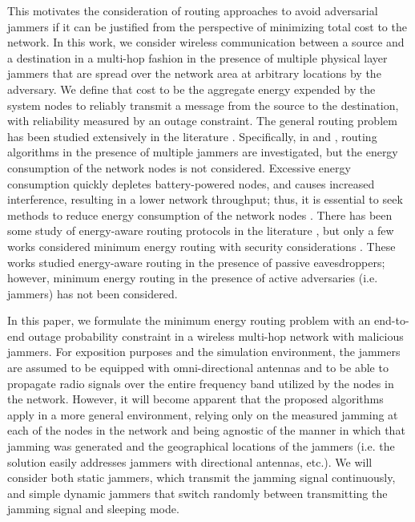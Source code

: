 \documentclass[10pt,journal]{IEEEtran}
\theoremstyle{definition}
\begin{document}
This motivates the consideration of routing approaches to avoid adversarial jammers  if it can be justified from the perspective of minimizing total cost to the network. In this work, we consider wireless communication between a source and a destination in a multi-hop fashion in the presence of multiple physical layer jammers that are spread over the network area at arbitrary locations by the adversary. 
 We define that cost to be the aggregate energy expended by the system nodes to reliably transmit a message from the source to the destination, with reliability measured by an outage constraint.
The general routing problem has been studied extensively in the literature
 \cite{broch1998performance,royer1999review,draves2004routing,perkins2008ad}. 
Specifically, in \cite{altman2009jamming} and \cite{tague2011jamming}, routing algorithms in the presence of multiple jammers are investigated, but the energy consumption of the network nodes is not considered.
 Excessive energy consumption quickly depletes  battery-powered nodes, and causes increased interference, resulting in a lower network throughput; thus, it is essential to seek  methods to  reduce  energy consumption of the network nodes \cite{feeney2001investigating}. 
There has been some study of energy-aware  routing protocols in the literature \cite{singh1998power,rodoplu1999minimum,chang2000energy,kwon2006energy,dehghan2011minimum}, but only a few works  considered minimum energy routing with security considerations \cite{ghaderi2013efficient,ghaderi2014min}. 
These works studied energy-aware routing in the presence of passive eavesdroppers; however, minimum energy routing in the presence of active adversaries (i.e. jammers) has not been considered.

In this paper, we formulate the minimum energy routing problem with an end-to-end outage probability constraint in a wireless multi-hop network with malicious jammers.  For exposition purposes and the simulation environment, the jammers are assumed to be equipped with omni-directional antennas and to be able to propagate radio signals over the entire frequency band utilized by the nodes in the network.  However, it will become apparent that the proposed algorithms apply in a more general environment, relying only on the measured jamming at each of the nodes in the network and being agnostic of the manner in which that jamming was generated and the geographical locations of the jammers (i.e. the solution easily addresses jammers with directional antennas, etc.).  We will consider both static jammers, which transmit the jamming signal continuously, and simple dynamic jammers that switch randomly between transmitting the jamming signal and sleeping mode. 
  
\end{document}
